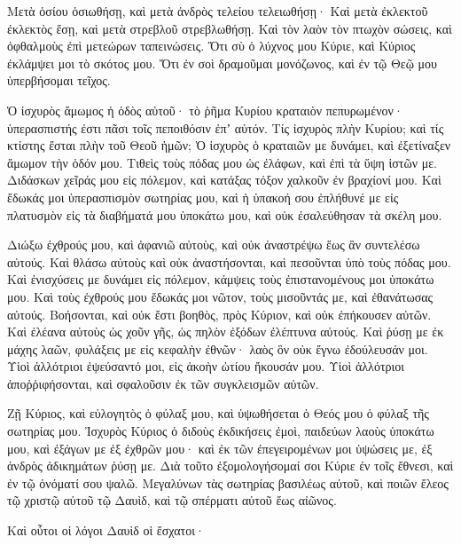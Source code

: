 {\par }{\PP {}Μετὰ ὁσίου ὁσιωθήσῃ, καὶ μετὰ ἀνδρὸς τελείου τελειωθήσῃ·
Καὶ μετὰ ἐκλεκτοῦ ἐκλεκτὸς ἔσῃ, καὶ μετὰ στρεβλοῦ στρεβλωθήσῃ.
Καὶ τὸν λαὸν τὸν πτωχὸν σώσεις, καὶ ὀφθαλμοὺς ἐπὶ μετεώρων ταπεινώσεις.
Ὅτι σὺ ὁ λύχνος μου Κύριε, καὶ Κύριος ἐκλάμψει μοι τὸ σκότος μου.
Ὅτι ἐν σοὶ δραμοῦμαι μονόζωνος, καὶ ἐν τῷ Θεῷ μου ὑπερβήσομαι τεῖχος.
\par }{\PP {}Ὁ ἰσχυρὸς ἄμωμος ἡ ὁδὸς αὐτοῦ· τὸ ῥῆμα Κυρίου κραταιὸν πεπυρωμένον· ὑπερασπιστής ἐστι πᾶσι τοῖς πεποιθόσιν ἐπʼ αὐτόν.
Τίς ἰσχυρὸς πλὴν Κυρίου; καὶ τίς κτίστης ἔσται πλὴν τοῦ Θεοῦ ἡμῶν;
Ὁ ἰσχυρὸς ὁ κραταιῶν με δυνάμει, καὶ ἐξετίναξεν ἄμωμον τὴν ὁδόν μου.
Τιθεὶς τοὺς πόδας μου ὡς ἐλάφων, καὶ ἐπὶ τὰ ὕψη ἱστῶν με.
Διδάσκων χεῖράς μου εἰς πόλεμον, καὶ κατάξας τόξον χαλκοῦν ἐν βραχίονί μου.
Καὶ ἔδωκάς μοι ὑπερασπισμὸν σωτηρίας μου, καὶ ἡ ὑπακοή σου ἐπλήθυνέ με εἰς πλατυσμὸν εἰς τὰ διαβήματά μου ὑποκάτω μου,
καὶ οὐκ ἐσαλεύθησαν τὰ σκέλη μου.
\par }{\PP {}Διώξω ἐχθρούς μου, καὶ ἀφανιῶ αὐτοὺς, καὶ οὐκ ἀναστρέψω ἕως ἂν συντελέσω αὐτούς.
Καὶ θλάσω αὐτοὺς καὶ οὐκ ἀναστήσονται, καὶ πεσοῦνται ὑπὸ τοὺς πόδας μου.
Καὶ ἐνισχύσεις με δυνάμει εἰς πόλεμον, κάμψεις τοὺς ἐπιστανομένους μοι ὑποκάτω μου.
Καὶ τοὺς ἐχθρούς μου ἔδωκάς μοι νῶτον, τοὺς μισοῦντάς με, καὶ ἐθανάτωσας αὐτούς.
Βοήσονται, καὶ οὐκ ἔστι βοηθὸς, πρὸς Κύριον, καὶ οὐκ ἐπήκουσεν αὐτῶν.
Καὶ ἐλέανα αὐτοὺς ὡς χοῦν γῆς, ὡς πηλὸν ἐξόδων ἐλέπτυνα αὐτούς.
Καὶ ῥύσῃ με ἐκ μάχης λαῶν, φυλάξεις με εἰς κεφαλὴν ἐθνῶν· λαὸς ὃν οὐκ ἔγνω ἐδούλευσάν μοι.
Υἱοὶ ἀλλότριοι ἐψεύσαντό μοι, εἰς ἀκοὴν ὠτίου ἤκουσάν μου.
Υἱοὶ ἀλλότριοι ἀποῤῥιφήσονται, καὶ σφαλοῦσιν ἐκ τῶν συγκλεισμῶν αὐτῶν.
\par }{\PP {}Ζῇ Κύριος, καὶ εὐλογητὸς ὁ φύλαξ μου, καὶ ὑψωθήσεται ὁ Θεός μου ὁ φύλαξ τῆς σωτηρίας μου.
Ἰσχυρὸς Κύριος ὁ διδοὺς ἐκδικήσεις ἐμοὶ, παιδεύων λαοὺς ὑποκάτω μου,
καὶ ἐξάγων με ἐξ ἐχθρῶν μου· καὶ ἐκ τῶν ἐπεγειρομένων μοι ὑψώσεις με, ἐξ ἀνδρὸς ἀδικημάτων ῥύσῃ με.
Διὰ τοῦτο ἐξομολογήσομαί σοι Κύριε ἐν τοῖς ἔθνεσι, καὶ ἐν τῷ ὀνόματί σου ψαλῶ.
Μεγαλύνων τὰς σωτηρίας βασιλέως αὐτοῦ, καὶ ποιῶν ἔλεος τῷ χριστῷ αὐτοῦ τῷ Δαυὶδ, καὶ τῷ σπέρματι αὐτοῦ ἕως αἰῶνος.
\par }{\PP Καὶ οὗτοι οἱ λόγοι Δαυὶδ οἱ ἔσχατοι·

}

